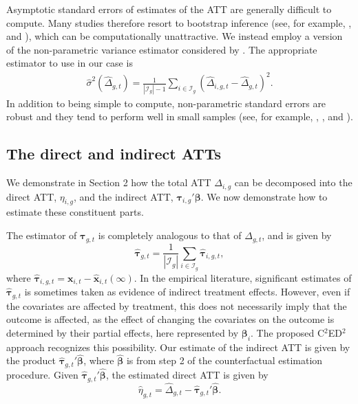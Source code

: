 \documentclass[12pt,fleqn]{article}
\def\*#1{\mathbf{#1}}
\def\+#1{\boldsymbol{#1}}
\begin{document}
Asymptotic standard errors of estimates of the ATT are generally difficult to compute. Many studies therefore resort to bootstrap inference (see, for example, \citealp{Callaway_Karami_2020}, and \citealp{Xu_2017}), which can be computationally unattractive. We instead employ a version of the non-parametric variance estimator considered by \citet{pesaran2006estimation}. The appropriate estimator to use in our case is
\begin{align}
\widehat \sigma^2(\widehat \Delta_{g,t}) = \frac{1}{|\mathcal{I}_g|-1}\sum_{i \in \mathcal{I}_g} (\widehat \Delta_{i,g,t}  - \widehat \Delta_{g,t})^2.\label{nonparametric variance estimator}
\end{align}
In addition to being simple to compute, non-parametric standard errors are robust and they tend to perform well in small samples (see, for example, \citealp{chudik2011weak}, \citealp{pesaran2006estimation}, and \citealp{westerlund2022cce}).

\subsection{The direct and indirect ATTs}

We demonstrate in Section 2 how the total ATT $\Delta_{i,g}$ can be decomposed into the direct ATT, $\eta_{i,g}$, and the indirect ATT, $\+\tau_{i,g}'\+\beta$. We now demonstrate how to estimate these constituent parts.

The estimator of $\+\tau_{g,t}$ is completely analogous to that of $\Delta_{g,t}$, and is given by
\begin{equation}
\widehat{\+\tau}_{g,t} = \frac{1}{|\mathcal{I}_g|} \sum_{i \in \mathcal{I}_g} \widehat{\+\tau}_{i,g,t}, \label{x treatment effect}
\end{equation}
where $\widehat{\+\tau}_{i,g,t} = \*x_{i,t} - \widehat{\*x}_{i,t}(\infty)$. In the empirical literature, significant estimates of $\widehat{\+\tau}_{g,t}$ is sometimes taken as evidence of indirect treatment effects. However, even if the covariates are affected by treatment, this does not necessarily imply that the outcome is affected, as the effect of changing the covariates on the outcome is determined by their partial effects, here represented by $\+\beta_i$. The proposed C$^2$ED$^2$ approach recognizes this possibility. Our estimate of the indirect ATT is given by the product $\widehat{\+\tau}_{g,t}' \widehat{\+\beta}$, where $\widehat{\+\beta}$ is from step 2 of the counterfactual estimation procedure. Given $\widehat{\+\tau}_{g,t}' \widehat{\+\beta}$, the estimated direct ATT is given by
\begin{equation}
\widehat{\eta}_{g,t} = \widehat{\Delta}_{g,t} - \widehat{\+\tau}_{g,t}' \widehat{\+\beta}.
\end{equation}
\end{document}
